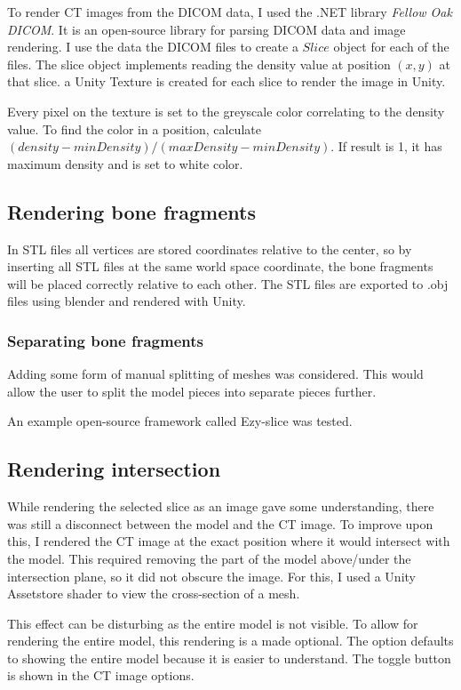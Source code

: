 \documentclass[a4paper]{report}
\begin{document}
To render CT images from the DICOM data, I used the .NET library \emph{Fellow Oak DICOM}\cite{noauthor_fellow_2022}. It is an open-source library for parsing DICOM data and image rendering.
I use the data the DICOM files to create a $Slice$ object for each of the files. The slice object implements reading the density value at position $(x, y)$ at that slice. a Unity Texture is created for each slice to render the image in Unity.

Every pixel on the texture is set to the greyscale color correlating to the density value. To find the color in a position, calculate $(density-minDensity)/(maxDensity-minDensity)$. If result is 1, it has maximum density and is set to white color.


\subsection{Rendering bone fragments}
In STL files all vertices are stored coordinates relative to the center, so by inserting all STL files at the same world space coordinate, the bone fragments will be placed correctly relative to each other. The STL files are exported to .obj files using blender and rendered with Unity.


\subsubsection{Separating bone fragments}
Adding some form of manual splitting of meshes was considered. This would allow the user to split the model pieces into separate pieces further.

An example open-source framework called Ezy-slice\cite{aryan} was tested.

\subsection{Rendering intersection}
While rendering the selected slice as an image gave some understanding, there was still a disconnect between the model and the CT image. To improve upon this, I rendered the CT image at the exact position where it would intersect with the model.
This required removing the part of the model above/under the intersection plane, so it did not obscure the image. For this, I used a Unity Assetstore shader to view the cross-section of a mesh\cite{aldandarawy_unity_2019}.

This effect can be disturbing as the entire model is not visible. To allow for rendering the entire model, this rendering is a made optional. The option defaults to showing the entire model because it is easier to understand.
The toggle button is shown in the CT image options.
\end{document}
